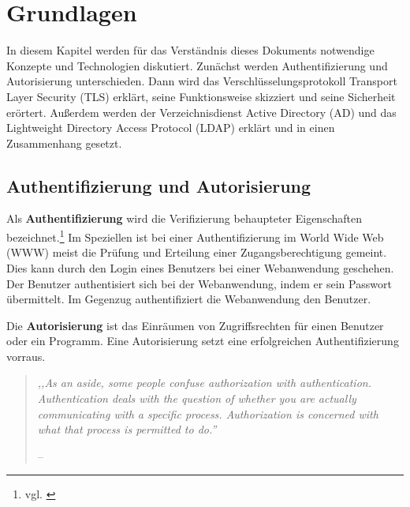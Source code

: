 \documentclass[12pt,a4paper,pointednumbers,abstracton]{scrartcl}
\begin{document}

\newpage
\section{Grundlagen}
\label{sec:basics}

In diesem Kapitel werden für das Verständnis dieses Dokuments notwendige Konzepte und Technologien diskutiert.
Zunächst werden Authentifizierung und Autorisierung unterschieden.
Dann wird das Verschlüsselungsprotokoll Transport Layer Security (TLS) erklärt, seine Funktionsweise skizziert und seine Sicherheit erörtert.
Außerdem werden der Verzeichnisdienst Active Directory (AD) und das Lightweight Directory Access Protocol (LDAP) erklärt und in einen Zusammenhang gesetzt.

\subsection{Authentifizierung und Autorisierung}

Als \textbf{Authentifizierung} wird die Verifizierung behaupteter Eigenschaften bezeichnet.\footnote{vgl. \cite[Section 8.7]{TW10}}
Im Speziellen ist bei einer Authentifizierung im World Wide Web (WWW) meist die Prüfung und Erteilung einer Zugangsberechtigung gemeint.
Dies kann durch den Login eines Benutzers bei einer Webanwendung geschehen.
Der Benutzer authentisiert sich bei der Webanwendung, indem er sein Passwort übermittelt.
Im Gegenzug authentifiziert die Webanwendung den Benutzer.

Die \textbf{Autorisierung} ist das Einräumen von Zugriffsrechten für einen Benutzer oder ein Programm.
Eine Autorisierung setzt eine erfolgreichen Authentifizierung vorraus.

\begin{quote}
\emph{,,As an aside, some people confuse authorization with authentication.
Authentication deals with the question of whether you are actually communicating with a specific process.
Authorization is concerned with what that process is permitted to do.''}
\begin{flushright}
\small{-- \cite[Section 8.7]{TW10}}
\end{flushright}
\end{quote}
\end{document}
